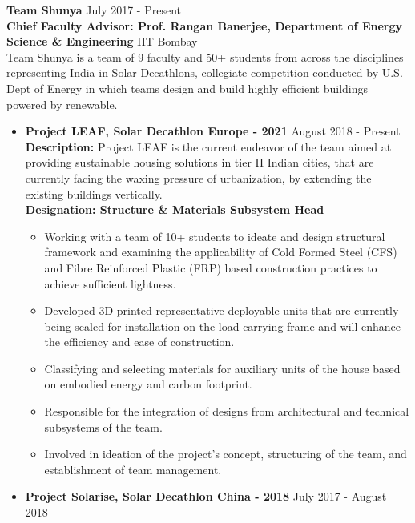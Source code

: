 
\textbf{Team Shunya} \hfill{July 2017 - Present}\\
\textbf{Chief Faculty Advisor: Prof. Rangan Banerjee, Department of Energy Science \& Engineering} \hfill{IIT Bombay} \\
{Team Shunya is a team of 9 faculty and 50+ students from across the disciplines representing India in Solar Decathlons, collegiate competition conducted by U.S. Dept of Energy in which teams design and build highly efficient buildings powered by renewable.}
\begin{itemize}
    \item {\textbf{Project LEAF, Solar Decathlon Europe - 2021} \hfill{August 2018 - Present}\\
        \textbf{Description:}{ Project LEAF is the current endeavor of the team aimed at providing sustainable housing solutions in tier II Indian cities, that are currently facing the waxing pressure of urbanization, by extending the existing buildings vertically.}\vspace{1mm}\\
        \textbf{Designation: Structure \&  Materials Subsystem Head}
        \begin{itemize}
            \setlength\itemsep{0.7mm}
            \item Working with a team of 10+ students to ideate and design structural framework and examining the applicability of Cold Formed Steel (CFS) and Fibre Reinforced Plastic (FRP) based construction practices to achieve sufficient lightness.
            \item Developed 3D printed representative deployable units that are currently being scaled for installation on the load-carrying frame and will enhance the efficiency and ease of construction.
            \item Classifying and selecting materials for auxiliary units of the house based on embodied energy and carbon footprint.
            \item Responsible for the integration of designs from architectural and technical subsystems of the team.
            \item Involved in ideation of the project's concept, structuring of the team, and establishment of team management.
        \end{itemize}}
        \vspace{7mm}
    \item {\textbf{Project Solarise, Solar Decathlon China - 2018} \hfill{July 2017 - August 2018}\\
}
\end{itemize}
